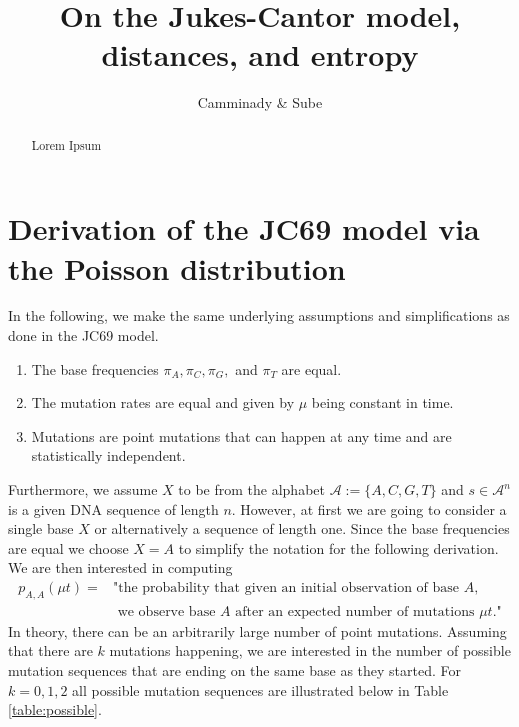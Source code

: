 \documentclass[12pt]{article}
\title{On the Jukes-Cantor model, distances, and entropy}
\author{Camminady \& Sube}
\begin{document}
\maketitle
\tableofcontents

\begin{abstract}
Lorem Ipsum
\end{abstract}

\section{Derivation of the JC69 model via the Poisson distribution}
In the following, we make the same underlying assumptions and simplifications as done in the JC69 model.
\begin{enumerate}
	\item The base frequencies $\pi_A,\pi_C,\pi_G,$ and $\pi_T$ are equal.
	\item The mutation rates are equal and given by $\mu$ being constant in time.
	\item Mutations are point mutations that can happen at any time and are statistically independent.
\end{enumerate}
Furthermore, we assume $X$ to be from the alphabet $\mathcal{A} := \{A,C,G,T\}$ and $s\in \mathcal{A}^n$ is a given DNA sequence of length $n$. However, at first we are going to consider a single base $X$ or alternatively a sequence of length one.
Since the base frequencies are equal we choose $X=A$ to simplify the notation for the following derivation. We are then interested in computing 
\begin{align}
	p_{A,A}(\mu t) = &\text{"the probability that given an initial observation  of base }A\text{,} 	\label{eq:pAA}\\ 
	&\text{ we observe base } A\text{ after an expected number of mutations }\mu t\text{."}
	\nonumber
\end{align}
In theory, there can be an arbitrarily large number of point mutations. Assuming that there are $k$ mutations happening, we are interested in the number of possible mutation sequences that are ending on the same base as they started. For $k=0,1,2$ all possible mutation sequences are illustrated below in Table \ref{table:possible}.
\end{document}
